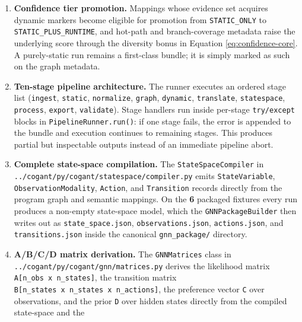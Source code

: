 \documentclass[
]{article}
\begin{document}
\begin{enumerate}
  appends \texttt{dynamic\_coverage} and \texttt{dynamic\_trace} markers
  to the program graph's evidence sources. The \texttt{dynamic} stage is
  part of the default pipeline stage list in
  \texttt{cogant/py/cogant/api/pipeline.py}, and the shipped CLI exposes
  a \texttt{-\/-no-dynamic} flag (handled by
  \texttt{PipelineConfig.skip\_dynamic}) for scripted runs that must
  force a purely-static bundle.
\item
  \textbf{Confidence tier promotion.} Mappings whose evidence set
  acquires dynamic markers become eligible for promotion from
  \texttt{STATIC\_ONLY} to \texttt{STATIC\_PLUS\_RUNTIME}, and hot-path
  and branch-coverage metadata raise the underlying score through the
  diversity bonus in Equation \ref{eq:confidence-core}. A purely-static
  run remains a first-class bundle; it is simply marked as such on the
  graph metadata.
\item
  \textbf{Ten-stage pipeline architecture.} The runner executes an
  ordered stage list (\texttt{ingest}, \texttt{static},
  \texttt{normalize}, \texttt{graph}, \texttt{dynamic},
  \texttt{translate}, \texttt{statespace}, \texttt{process},
  \texttt{export}, \texttt{validate}). Stage handlers run inside
  per-stage \texttt{try/except} blocks in \texttt{PipelineRunner.run()}:
  if one stage fails, the error is appended to the bundle and execution
  continues to remaining stages. This produces partial but inspectable
  outputs instead of an immediate pipeline abort.
\item
  \textbf{Complete state-space compilation.} The
  \texttt{StateSpaceCompiler} in
  \texttt{../cogant/py/cogant/statespace/compiler.py} emits
  \texttt{StateVariable}, \texttt{ObservationModality}, \texttt{Action},
  and \texttt{Transition} records directly from the program graph and
  semantic mappings. On the \textbf{6} packaged fixtures every run
  produces a non-empty state-space model, which the
  \texttt{GNNPackageBuilder} then writes out as
  \texttt{state\_space.json}, \texttt{observations.json},
  \texttt{actions.json}, and \texttt{transitions.json} inside the
  canonical \texttt{gnn\_package/} directory.
\item
  \textbf{A/B/C/D matrix derivation.} The \texttt{GNNMatrices} class in
  \texttt{../cogant/py/cogant/gnn/matrices.py} derives the likelihood
  matrix \texttt{A{[}n\_obs\ x\ n\_states{]}}, the transition matrix
  \texttt{B{[}n\_states\ x\ n\_states\ x\ n\_actions{]}}, the preference
  vector \texttt{C} over observations, and the prior \texttt{D} over
  hidden states directly from the compiled state-space and the

\end{enumerate}
\end{document}
